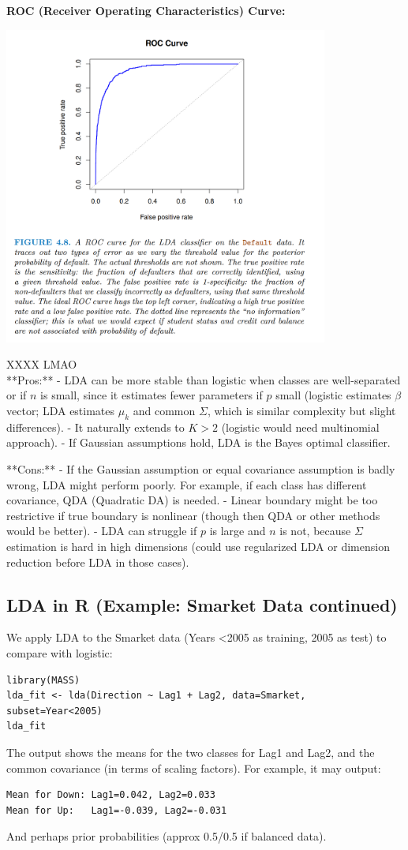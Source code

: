 \documentclass[11pt]{article}
\begin{document}
\noindent \textbf{ROC (Receiver Operating Characteristics) Curve:}
\begin{center}
  \includegraphics[width=0.8\textwidth]{LDA Example ROC Curve.png}
\end{center}
XXXX LMAO \\

**Pros:** 
- LDA can be more stable than logistic when classes are well-separated or if $n$ is small, since it estimates fewer parameters if $p$ small (logistic estimates $\beta$ vector; LDA estimates $\mu_k$ and common $\Sigma$, which is similar complexity but slight differences). 
- It naturally extends to $K>2$ (logistic would need multinomial approach).
- If Gaussian assumptions hold, LDA is the Bayes optimal classifier.

**Cons:** 
- If the Gaussian assumption or equal covariance assumption is badly wrong, LDA might perform poorly. For example, if each class has different covariance, QDA (Quadratic DA) is needed.
- Linear boundary might be too restrictive if true boundary is nonlinear (though then QDA or other methods would be better).
- LDA can struggle if $p$ is large and $n$ is not, because $\Sigma$ estimation is hard in high dimensions (could use regularized LDA or dimension reduction before LDA in those cases).

\subsection{LDA in R (Example: Smarket Data continued)}
We apply LDA to the Smarket data (Years <2005 as training, 2005 as test) to compare with logistic:
\begin{verbatim}
library(MASS)
lda_fit <- lda(Direction ~ Lag1 + Lag2, data=Smarket, subset=Year<2005)
lda_fit
\end{verbatim}
The output shows the means for the two classes for Lag1 and Lag2, and the common covariance (in terms of scaling factors). For example, it may output:
\begin{verbatim}
Mean for Down: Lag1=0.042, Lag2=0.033
Mean for Up:   Lag1=-0.039, Lag2=-0.031
\end{verbatim}
And perhaps prior probabilities (approx 0.5/0.5 if balanced data).
\end{document}
